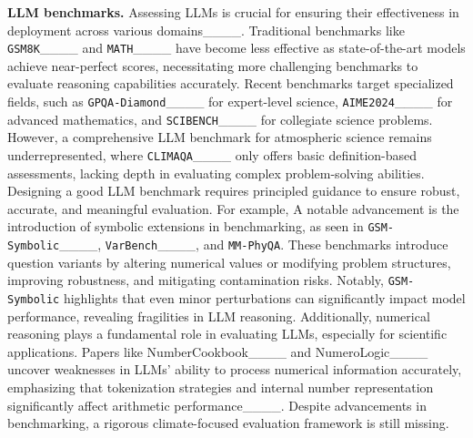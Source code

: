 




\textbf{LLM benchmarks.}
\label{sec:llm_benchmarks}
Assessing LLMs is crucial for ensuring their effectiveness in deployment across various domains____. Traditional benchmarks like \texttt{GSM8K}____ and \texttt{MATH}____ have become less effective as state-of-the-art models achieve near-perfect scores, necessitating more challenging benchmarks to evaluate reasoning capabilities accurately.
Recent benchmarks target specialized fields, such as \texttt{GPQA-Diamond}____ for expert-level science, \texttt{AIME2024}____ for advanced mathematics, and \texttt{SCIBENCH}____ for collegiate science problems. 
However, a comprehensive LLM benchmark for atmospheric science remains underrepresented, where \texttt{CLIMAQA}____ only offers basic definition-based assessments, lacking depth in evaluating complex problem-solving abilities.
Designing a good LLM benchmark requires principled guidance to ensure robust, accurate, and meaningful evaluation. For example, A notable advancement is the introduction of symbolic extensions in benchmarking, as seen in \texttt{GSM-Symbolic}____, \texttt{VarBench}____, and \texttt{MM-PhyQA}. These benchmarks introduce question variants by altering numerical values or modifying problem structures, improving robustness, and mitigating contamination risks. Notably, \texttt{GSM-Symbolic} highlights that even minor perturbations can significantly impact model performance, revealing fragilities in LLM reasoning.
Additionally, numerical reasoning plays a fundamental role in evaluating LLMs, especially for scientific applications. Papers like NumberCookbook____ and NumeroLogic____ uncover weaknesses in LLMs' ability to process numerical information accurately, emphasizing that tokenization strategies and internal number representation significantly affect arithmetic performance____.
Despite advancements in benchmarking, a rigorous climate-focused evaluation framework is still missing. %

